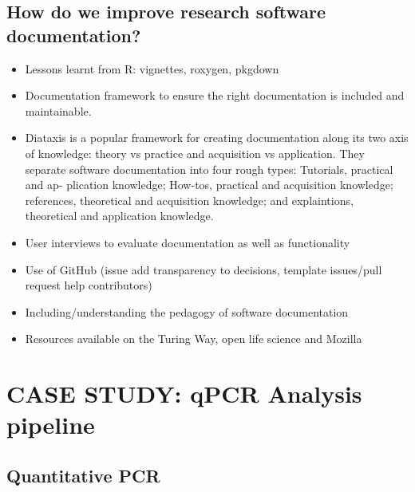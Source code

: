 \documentclass{SBCbookchapter}
\begin{document}
\subsection{How do we improve research software documentation?}

\begin{itemize}
    \item Lessons learnt from R: vignettes, roxygen, pkgdown
    \item Documentation framework to ensure the right documentation is included and maintainable.
    \item Diataxis is a popular framework for creating documentation along its two axis of knowledge: theory vs practice and acquisition vs application. They separate software documentation into four rough types: Tutorials, practical and ap- plication knowledge; How-tos, practical and acquisition knowledge; references, theoretical and acquisition knowledge; and explaintions, theoretical and application knowledge. %
    \item User interviews to evaluate documentation as well as functionality
    \item Use of GitHub (issue add transparency to decisions, template issues/pull request help contributors)
    \item Including/understanding the pedagogy of software documentation
    \item Resources available on the Turing Way, open life science and Mozilla
\end{itemize}


\section{CASE STUDY: qPCR Analysis pipeline}

\subsection{Quantitative PCR}
\end{document}

